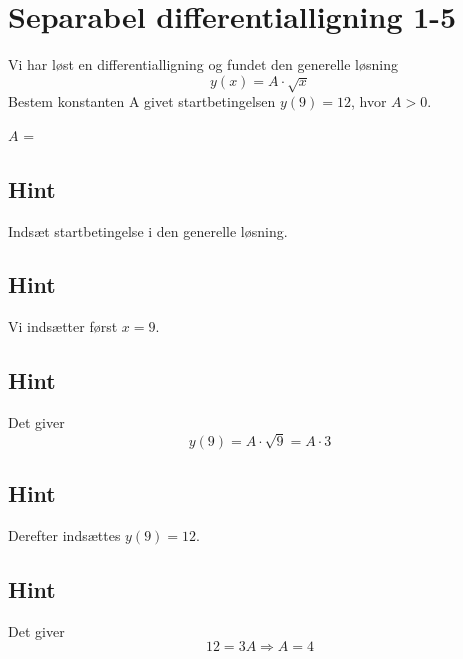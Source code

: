 \documentclass{article}
\newenvironment{exercise}[1]{\newpage\section{#1}}{}
\newcommand{\answerbox}[1]{\fbox{$#1$}}
\newcommand{\hint}{\subsection*{Hint}}
\begin{document}
\begin{exercise}{Separabel differentialligning 1-5}
	
	
	Vi har løst en differentialligning og fundet den generelle løsning
	\[
	y(x) =  A \cdot \sqrt{x}
	\]
	Bestem konstanten A givet startbetingelsen $y(9)=12$, hvor $A>0$.
	
	$A$ = \answerbox{4}
	
	\hint
	
	Indsæt startbetingelse i den generelle løsning. 
	
	
	\hint
	
	Vi indsætter først $x=9$.
	
	\hint
	
	Det giver
	\[
	y(9)=  A \cdot \sqrt{9} = A	\cdot 3
	\]
	
	\hint
	
	Derefter indsættes $y(9)=12$.
	
	\hint 
	
	Det giver 
	\[
	12  = 3A  \Rightarrow A = 4
	\]
	
\end{exercise}
\end{document}
